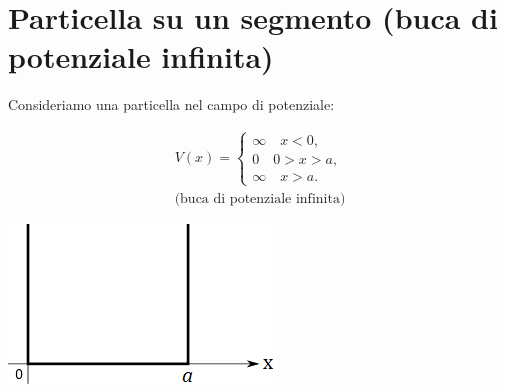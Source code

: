 \documentclass[a4paper,11pt,oneside]{book}
\begin{document}
\section{Particella su un segmento (buca di potenziale infinita)}
Consideriamo una particella nel campo di potenziale:\\

\begin{minipage}{.5\textwidth}
\begin{align}
V(x)= 
\begin{cases}
\infty \quad x<0,\\
0 \quad 0>x>a, \\
\infty \quad x>a.
\end{cases}
\\
\textrm{(buca di potenziale infinita)} \nonumber
\end{align}	
\end{minipage}
\hspace{.5cm}
\begin{minipage}{.4\textwidth}
\includegraphics[width=\textwidth]{immagini/cap_10/fig_10_1.png}
\end{minipage}\\
\end{document}
